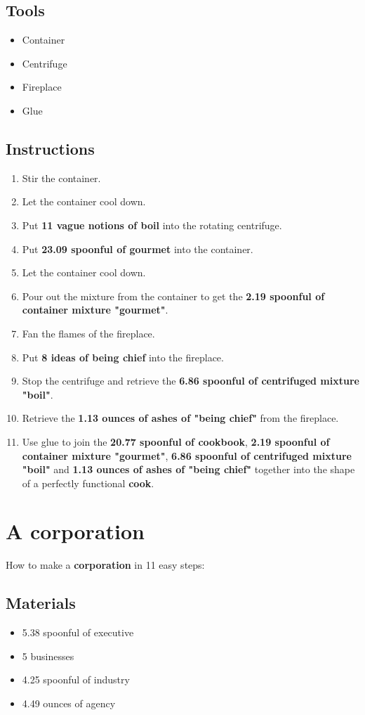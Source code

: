 \documentclass{article}
\begin{document}
\subsection{Tools}\begin{itemize}
\item 
Container
\item 
Centrifuge
\item 
Fireplace
\item 
Glue
\end{itemize}
\subsection{Instructions}\begin{enumerate}
\item 
Stir the container.
\item 
Let the container cool down.
\item 
Put \textbf{11 vague notions of boil} into the rotating centrifuge.
\item 
Put \textbf{23.09 spoonful of gourmet} into the container.
\item 
Let the container cool down.
\item 
Pour out the mixture from the container to get the \textbf{2.19 spoonful of container mixture "gourmet"}.
\item 
Fan the flames of the fireplace.
\item 
Put \textbf{8 ideas of being chief} into the fireplace.
\item 
Stop the centrifuge and retrieve the \textbf{6.86 spoonful of centrifuged mixture "boil"}.
\item 
Retrieve the \textbf{1.13 ounces of ashes of "being chief"} from the fireplace.
\item 
Use glue to join the \textbf{20.77 spoonful of cookbook}, \textbf{2.19 spoonful of container mixture "gourmet"}, \textbf{6.86 spoonful of centrifuged mixture "boil"} and \textbf{1.13 ounces of ashes of "being chief"} together into the shape of a perfectly functional \textbf{cook}.
\end{enumerate}
\newpage
\section{A corporation}How to make a \textbf{corporation} in 11 easy steps:

\subsection{Materials}\begin{itemize}
\item 
5.38 spoonful of executive
\item 
5 businesses
\item 
4.25 spoonful of industry
\item 
4.49 ounces of agency
\end{itemize}
\end{document}
